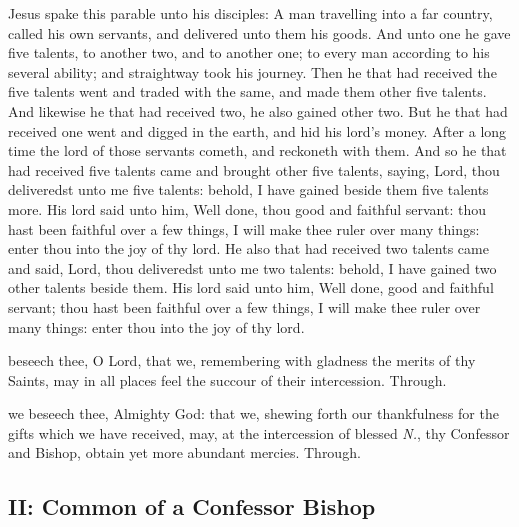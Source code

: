  Jesus spake this parable unto his disciples: A man travelling into a far country, called his own servants, and delivered unto them his goods. And unto one he gave five talents, to another two, and to another one; to every man according to his several ability; and straightway took his journey. Then he that had received the five talents went and traded with the same, and made them other five talents. And likewise he that had received two, he also gained other two. But he that had received one went and digged in the earth, and hid his lord’s money. After a long time the lord of those servants cometh, and reckoneth with them. And so he that had received five talents came and brought other five talents, saying, Lord, thou deliveredst unto me five talents: behold, I have gained beside them five talents more. His lord said unto him, Well done, thou good and faithful servant: thou hast been faithful over a few things, I will make thee ruler over many things: enter thou into the joy of thy lord. He also that had received two talents came and said, Lord, thou deliveredst unto me two talents: behold, I have gained two other talents beside them. His lord said unto him, Well done, good and faithful servant; thou hast been faithful over a few things, I will make thee ruler over many things: enter thou into the joy of thy lord.


\secret\label{CommonConfessorBishopISecret}
 beseech thee, O Lord, that we, remembering with gladness the merits of thy Saints, may in all places feel the succour of their intercession. Through.


\postcommunion\label{CommonConfessorBishopIPostcommunion}
 we beseech thee, Almighty God: that we, shewing forth our thankfulness for the gifts which we have received, may, at the intercession of blessed \textit{N.}, thy Confessor and Bishop, obtain yet more abundant mercies. Through.


\subsection{II: Common of a Confessor Bishop}\label{CommonConfessorBishopII}

